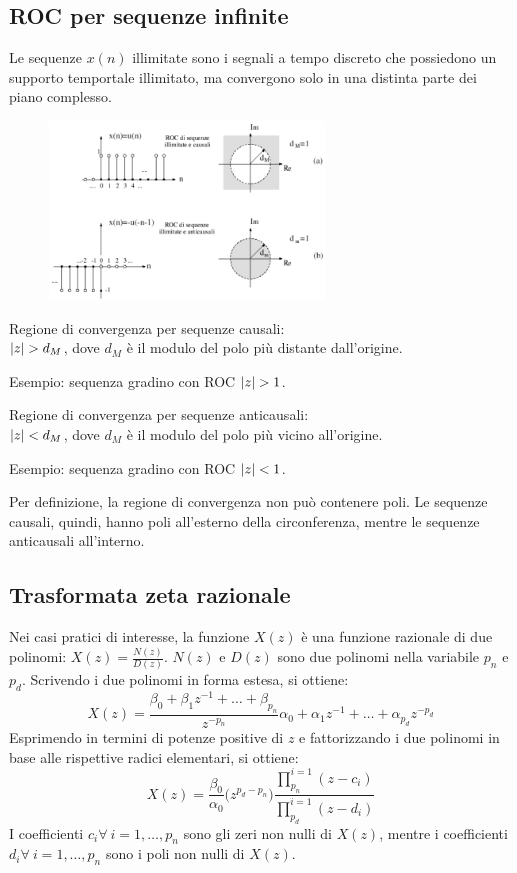 \subsection{ROC per sequenze infinite}
Le sequenze $x(n)$ illimitate sono i segnali a tempo discreto che possiedono un supporto temportale illimitato, ma convergono solo in una distinta parte dei piano complesso. 

\begin{figure}
	\vspace{-35pt}
	\includegraphics[width=0.65\textwidth]{Lezioni/Immagini/rocinf}
	\vspace{-35pt}
\end{figure}

Regione di convergenza per sequenze causali: \\
$\left|z\right| > d_M$, dove $d_M$ è il modulo del polo più distante dall'origine.

Esempio: sequenza gradino con ROC $\left|z\right| > 1$.

Regione di convergenza per sequenze anticausali: \\
$\left|z\right| < d_M$, dove $d_M$ è il modulo del polo più vicino all'origine. 

Esempio: sequenza gradino con ROC $\left|z\right| < 1$.

Per definizione, la regione di convergenza non può contenere poli. Le sequenze causali, quindi, hanno poli all'esterno della circonferenza, mentre le sequenze anticausali all'interno.

\subsection{Trasformata zeta razionale}
Nei casi pratici di interesse, la funzione $X(z)$ è una funzione razionale di due polinomi: $X(z) = \frac{N(z)}{D(z)}$.
$N(z)$ e $D(z)$ sono due polinomi nella variabile $p_n$ e $p_d$. Scrivendo i due polinomi in forma estesa, si ottiene:
$$X(z) = \frac{\beta_0 + \beta_1z^{-1} + \dots + \beta_{p_n}}{z^{-p_n}}{\alpha_0 + \alpha_1z^{-1} + \dots + \alpha_{p_d}z^{-p_d}}$$
Esprimendo in termini di potenze positive di $z$ e fattorizzando i due polinomi in base alle rispettive radici elementari, si ottiene:
$$X(z) = \frac{\beta_0}{\alpha_0}\big(z^{p_d - p_n}\big) \frac{\prod_{p_n}^{i=1}(z-c_i)}{\prod_{p_d}^{i=1}(z-d_i)}$$
I coefficienti $c_i \forall\ i = 1, \dots, p_n$ sono gli zeri non nulli di $X(z)$, mentre i coefficienti $d_i \forall\ i = 1, \dots, p_n$ sono i poli non nulli di $X(z)$.

